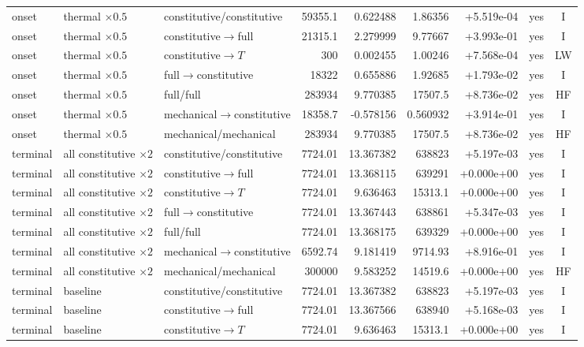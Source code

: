 \begin{landscape}
\begin{longtable}{@{}p{1.15cm}p{2.55cm}p{3.60cm}rrrrcc@{}}
onset & thermal $\times0.5$ & constitutive/constitutive & 59355.1 & 0.622488 & 1.86356 & +5.519e-04 & yes & I \\
onset & thermal $\times0.5$ & constitutive$\rightarrow$full & 21315.1 & 2.279999 & 9.77667 & +3.993e-01 & yes & I \\
onset & thermal $\times0.5$ & constitutive$\rightarrow T$ & 300 & 0.002455 & 1.00246 & +7.568e-04 & yes & LW \\
onset & thermal $\times0.5$ & full$\rightarrow$constitutive & 18322 & 0.655886 & 1.92685 & +1.793e-02 & yes & I \\
onset & thermal $\times0.5$ & full/full & 283934 & 9.770385 & 17507.5 & +8.736e-02 & yes & HF \\
onset & thermal $\times0.5$ & mechanical$\rightarrow$constitutive & 18358.7 & -0.578156 & 0.560932 & +3.914e-01 & yes & I \\
onset & thermal $\times0.5$ & mechanical/mechanical & 283934 & 9.770385 & 17507.5 & +8.736e-02 & yes & HF \\
terminal & all constitutive $\times2$ & constitutive/constitutive & 7724.01 & 13.367382 & 638823 & +5.197e-03 & yes & I \\
terminal & all constitutive $\times2$ & constitutive$\rightarrow$full & 7724.01 & 13.368115 & 639291 & +0.000e+00 & yes & I \\
terminal & all constitutive $\times2$ & constitutive$\rightarrow T$ & 7724.01 & 9.636463 & 15313.1 & +0.000e+00 & yes & I \\
terminal & all constitutive $\times2$ & full$\rightarrow$constitutive & 7724.01 & 13.367443 & 638861 & +5.347e-03 & yes & I \\
terminal & all constitutive $\times2$ & full/full & 7724.01 & 13.368175 & 639329 & +0.000e+00 & yes & I \\
terminal & all constitutive $\times2$ & mechanical$\rightarrow$constitutive & 6592.74 & 9.181419 & 9714.93 & +8.916e-01 & yes & I \\
terminal & all constitutive $\times2$ & mechanical/mechanical & 300000 & 9.583252 & 14519.6 & +0.000e+00 & yes & HF \\
terminal & baseline & constitutive/constitutive & 7724.01 & 13.367382 & 638823 & +5.197e-03 & yes & I \\
terminal & baseline & constitutive$\rightarrow$full & 7724.01 & 13.367566 & 638940 & +5.168e-03 & yes & I \\
terminal & baseline & constitutive$\rightarrow T$ & 7724.01 & 9.636463 & 15313.1 & +0.000e+00 & yes & I \\

\end{longtable}
\end{landscape}
